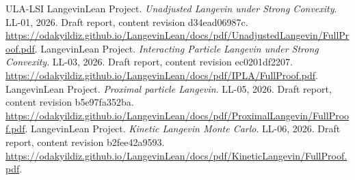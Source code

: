 \documentclass[11pt,a4paper]{report}
\begin{document}
\begin{thebibliography}{ULA-LSI}
LangevinLean Project. \emph{Unadjusted Langevin under Strong Convexity}. LL-01, 2026. Draft report, content revision d34ead06987c. \url{https://odakyildiz.github.io/LangevinLean/docs/pdf/UnadjustedLangevin/FullProof.pdf}.
LangevinLean Project. \emph{Interacting Particle Langevin under Strong Convexity}. LL-03, 2026. Draft report, content revision ec0201df2207. \url{https://odakyildiz.github.io/LangevinLean/docs/pdf/IPLA/FullProof.pdf}.
LangevinLean Project. \emph{Proximal particle Langevin}. LL-05, 2026. Draft report, content revision b5e97fa352ba. \url{https://odakyildiz.github.io/LangevinLean/docs/pdf/ProximalLangevin/FullProof.pdf}.
LangevinLean Project. \emph{Kinetic Langevin Monte Carlo}. LL-06, 2026. Draft report, content revision b2fee42a9593. \url{https://odakyildiz.github.io/LangevinLean/docs/pdf/KineticLangevin/FullProof.pdf}.
\end{thebibliography}
\end{document}

